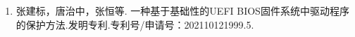 \begin{APP2}
\begin{enumerate}

    \item 张建标，唐治中，张恒等. 一种基于基础性的UEFI BIOS固件系统中驱动程序的保护方法.发明专利.专利号/申请号：202110121999.5.
    
\end{enumerate}
\end{APP2}

\bjutclearpage